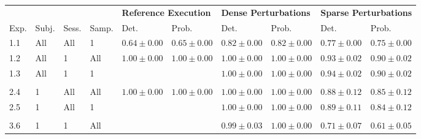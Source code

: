 
\begin{tabular}{llll|ll|ll|ll}
  &  &  &  &  \multicolumn{2}{l|}{\textbf{Reference Execution}} & \multicolumn{2}{l|}{\textbf{Dense Perturbations}} &  \multicolumn{2}{l}{\textbf{Sparse Perturbations}} \\
Exp. & Subj. & Sess. & Samp. & Det. &  Prob. &  Det. &    Prob. &     Det. &    Prob. \\
\hline
1.1        &          All &      All &          1 & \cellcolor{color1!10}$ 0.64 \pm 0.00 $ & \cellcolor{color1!10}$ 0.65 \pm 0.00 $  & \cellcolor{color1!10}$ 0.82 \pm 0.00 $ & \cellcolor{color1!10}$ 0.82 \pm 0.00 $ & \cellcolor{color1!10}$ 0.77 \pm 0.00 $ & \cellcolor{color1!10}$ 0.75 \pm 0.00 $ \\
1.2        &          All &        1 &        All &  $ 1.00 \pm 0.00 $ &  $ 1.00 \pm 0.00 $ &  $ 1.00 \pm 0.00 $ &  $ 1.00 \pm 0.00 $ &  $ 0.93 \pm 0.02 $ &  $ 0.90 \pm 0.02 $ \\
1.3        &          All &        1 &          1 &        &  &  $ 1.00 \pm 0.00 $ &  $ 1.00 \pm 0.00 $ &  $ 0.94 \pm 0.02 $ &  $ 0.90 \pm 0.02 $ \\
& & & & & & & & & \vspace{-5pt}\\
2.4        &            1 &      All &        All &  \cellcolor{color1!10}$ 1.00 \pm 0.00 $ &  \cellcolor{color1!10}$ 1.00 \pm 0.00 $  &  \cellcolor{color1!10}$ 1.00 \pm 0.00 $ &  \cellcolor{color1!10}$ 1.00 \pm 0.00 $ &  \cellcolor{color1!10}$ 0.88 \pm 0.12 $ &  \cellcolor{color1!10}$ 0.85 \pm 0.12 $ \\
2.5        &            1 &      All &          1 &        &  &  $ 1.00 \pm 0.00 $ &  $ 1.00 \pm 0.00 $ &  $ 0.89 \pm 0.11 $ &  $ 0.84 \pm 0.12 $ \\
& & & & & & & & & \vspace{-5pt}\\
3.6        &            1 &        1 &        All &         &  &  \cellcolor{color1!10}$ 0.99 \pm 0.03 $ &  \cellcolor{color1!10}$ 1.00 \pm 0.00 $ &  \cellcolor{color1!10}$ 0.71 \pm 0.07 $ &  \cellcolor{color1!10}$ 0.61 \pm 0.05 $ \\
\end{tabular}


